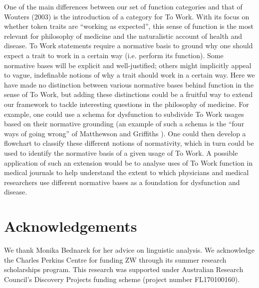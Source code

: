 \documentclass{article}
\begin{document}
One of the main differences between our set of function categories and that of Wouters (2003) \cite{wouters2003} is the introduction of a category for To Work.
With its focus on whether token traits are ``working as expected'', this sense of function is the most relevant for philosophy of medicine and the naturalistic account of health and disease.
To Work statements require a normative basis to ground why one should expect a trait to work in a certain way (i.e. perform its function).
Some normative bases will be explicit and well-justified; others might implicitly appeal to vague, indefinable notions of why a trait should work in a certain way.
Here we have made no distinction between various normative bases behind function in the sense of To Work, but adding these distinctions could be a fruitful way to extend our framework to tackle interesting questions in the philosophy of medicine.
  For example, one could use a schema for dysfunction to subdivide To Work usages based on their normative grounding (an example of such a schema is the ``four ways of going wrong'' of Matthewson and Griffiths \cite{matthewson2017}).
  One could then develop a flowchart to classify these different notions of normativity, which in turn could be used to identify the normative basis of a given usage of To Work.
A possible application of such an extension would be to analyse uses of To Work function in medical journals to help understand the extent to which physicians and medical researchers use different normative bases as a foundation for dysfunction and disease.

\section{Acknowledgements}
\label{sec:acknowledgements}

We thank Monika Bednarek for her advice on linguistic analysis.
We acknowledge the Charles Perkins Centre for funding ZW through its summer research scholarships program.
This research was supported under Australian Research Council's Discovery Projects funding scheme (project number FL170100160).



\end{document}

